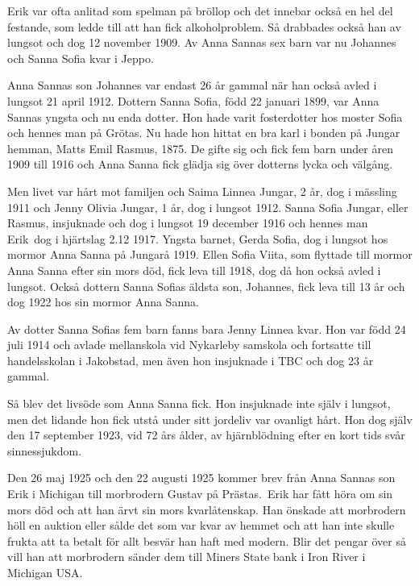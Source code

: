 Erik var ofta anlitad som spelman på bröllop och det innebar också en hel del festande, som ledde till att han fick alkoholproblem. Så drabbades också han av lungsot och dog 12 november 1909. Av Anna Sannas sex barn var nu Johannes och Sanna Sofia kvar i Jeppo.

Anna Sannas son Johannes var endast 26 år gammal när han också avled i lungsot 21 april 1912. Dottern Sanna Sofia, född 22 januari 1899, var Anna Sannas yngsta och nu enda dotter. Hon hade varit fosterdotter hos moster Sofia och hennes man på Grötas. Nu hade hon hittat en bra karl i bonden på Jungar hemman, Matts Emil Rasmus,  1875.
De gifte sig och fick fem barn under åren 1909 till 1916 och Anna Sanna fick glädja sig över dotterns lycka och välgång.

Men livet var hårt mot familjen och Saima Linnea Jungar, 2 år, dog i mässling 1911 och Jenny Olivia Jungar, 1 år, dog i lungsot 1912. Sanna Sofia Jungar, eller Rasmus, insjuknade och dog i lungsot 19 december 1916 och hennes man Erik dog i hjärtslag 2.12 1917. Yngsta barnet, Gerda Sofia, dog i lungsot hos mormor Anna Sanna på Jungarå 1919. Ellen Sofia Viita, som flyttade till mormor Anna Sanna efter sin mors död, fick leva till 1918, dog då hon också avled i lungsot. Också dottern Sanna Sofias äldsta son, Johannes, fick leva till 13 år och dog 1922 hos sin mormor Anna Sanna.

Av dotter Sanna Sofias fem barn fanns bara Jenny Linnea kvar. Hon var född 24 juli 1914 och avlade mellanskola vid Nykarleby samskola och fortsatte till handelsskolan i Jakobstad, men även hon insjuknade i TBC och dog 23 år gammal.

Så blev det livsöde som Anna Sanna fick. Hon insjuknade inte själv i lungsot, men det lidande hon fick utstå under sitt jordeliv var ovanligt hårt. Hon dog själv den 17 september 1923, vid 72 års ålder, av hjärnblödning efter en kort tids svår sinnessjukdom.


Den 26 maj 1925 och den 22 augusti 1925 kommer brev från Anna Sannas son Erik i Michigan till morbrodern Gustav på Prästas. Erik har fått höra om sin mors död och att han ärvt sin mors kvarlåtenskap. Han önskade att morbrodern höll en auktion eller sålde det som var kvar av hemmet och att han inte skulle frukta att ta betalt för allt besvär han haft med modern. Blir det pengar över så vill han att morbrodern sänder dem till Miners State bank i Iron River i Michigan USA.

